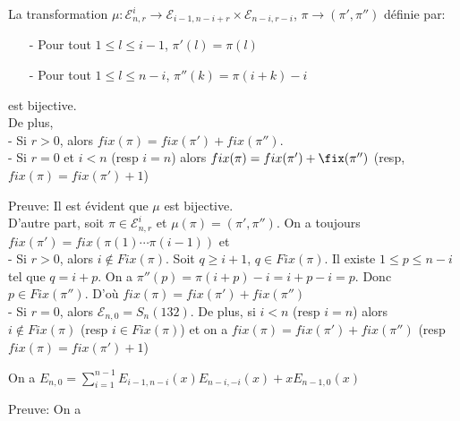 \begin{proposition}\label{p7}
	La transformation $\mu: \mathcal{E}_{n, r}^{i} \longrightarrow \mathcal{E}_{i-1, n-i+r}\times \mathcal{E}_{n-i, r-i}$, $\pi \longrightarrow (\pi', \pi'')$ définie par:
	\begin{itemize}
		\item[-] Pour tout $1 \leq l \leq i-1 $, $\pi'(l) = \pi(l)$
		\item[-] Pour tout $1 \leq l \leq n-i$, $\pi''(k) = \pi(i+k)-i$
	\end{itemize}
	est bijective.\vspace{5pt}\\
	De plus, \\
	- Si $r>0$, alors $fix(\pi) = fix(\pi') + fix(\pi'')$.\\
	- Si $r=0$ et $i<n$ (resp $i=n$) alors $fix(\pi) = fix(\pi') + \fix(\pi'')$ (resp, $fix(\pi) = fix(\pi') + 1$)
\end{proposition}
Preuve: Il est évident que $\mu$ est bijective.\\
D'autre part, soit $\pi \in \mathcal{E}_{n, r}^{i}$ et $\mu(\pi)=(\pi', \pi'')$. On a toujours $fix(\pi') = fix(\pi(1)\cdots \pi(i-1))$ et\\
- Si $r>0$, alors $i \notin Fix(\pi)$. Soit $q\geq i+1$, $q\in Fix(\pi)$. Il existe $1 \leq p \leq n-i$ tel que $q=i+p$. On a $\pi''(p) = \pi(i+p) - i = i+p - i = p$. Donc $p \in Fix(\pi'')$. D'où $fix(\pi) =  fix(\pi') + fix(\pi'')$\\
- Si $r=0$, alors $\mathcal{E}_{n, 0} = S_{n}(132)$. De plus, si $i<n$ (resp $i=n$) alors $i\notin Fix(\pi)$ (resp $i \in Fix(\pi)$) et on a $fix(\pi) = fix(\pi') + fix(\pi'')$ (resp  $fix(\pi) = fix(\pi') + 1$)
\begin{proposition}\label{p8}
	On a $E_{n, 0} = \sum\limits_{i=1}^{n-1}E_{i-1, n-i}(x)E_{n-i, -i}(x) + xE_{n-1, 0}(x)$
\end{proposition}
Preuve: On a
